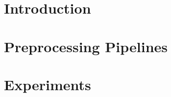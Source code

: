 \documentclass[sigconf]{acmart}
\begin{document}


\maketitle
\section{Introduction}


\label{sec:introduction}

\section{Preprocessing Pipelines}
\label{sec:preprocessing}


\section{Experiments}
\label{sec:experiments}

\end{document}
